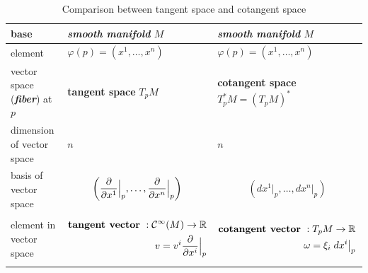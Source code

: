 \documentclass[11pt]{article}
\begin{document}
\begin{table}[h!]
\setlength{\abovedisplayskip}{0pt}
\setlength{\belowdisplayskip}{-10pt}
\setlength{\abovedisplayshortskip}{0pt}
\setlength{\belowdisplayshortskip}{0pt}
\centering
\caption{Comparison between tangent space and cotangent space}
\label{tab: tangent_cotangent}
\renewcommand\tabularxcolumn[1]{m{#1}}
\footnotesize
\begin{tabularx}{1\textwidth} { 
  | >{\raggedright\arraybackslash} m{2cm}
  | >{\centering\arraybackslash}X
  | >{\centering\arraybackslash}X  | }
 \hline
 base &  \emph{\textbf{smooth manifold}} $M$ & \emph{\textbf{smooth manifold}} $M$  \\
 \hline
 element  & $\varphi(p) = (x^1, \ldots, x^{n})$ & $\varphi(p) = (x^1, \ldots, x^{n})$\\
\hline
vector space (\emph{\textbf{fiber}}) at $p$ &  \textbf{tangent space}  $T_{p}M$ &  \textbf{cotangent space} $T_{p}^{*}M = (T_{p}M)^{*}$ \\
\hline
dimension of vector space & $n$ & $n$  \\
\hline
basis of vector space & 
\vspace{-1.25em}
\begin{align*}
 \left(\dfrac{\partial}{\partial x^{1}}\Bigr|_{p}, \ldots, \dfrac{\partial}{\partial x^{n}}\Bigr|_{p}\right)
\end{align*}
\vspace{-1em}
 &   
\vspace{-1.25em}
\begin{align*}
 (dx^1\bigr|_{p}, \ldots, dx^n\bigr|_{p})
\end{align*} \vspace{-1em}\\
\hline
element in vector space   &
\vspace{-1.25em}
 \begin{align*} 
\text{\textbf{tangent vector} }:{\mathcal C}^{\infty}(M) \rightarrow {\mathbb R}\\
  v = v^{i}\dfrac{\partial}{\partial x^{i}}\Bigr|_{p}
 \end{align*} \vspace{-1em}  & 
\vspace{-1.25em} 
 \begin{align*} 
 \text{\textbf{cotangent vector} }:T_pM \rightarrow {\mathbb R}\\
 \omega = \xi_{i}\;dx^i\bigr|_{p}
 \end{align*} \vspace{-1em} \\

\end{tabularx}
\end{table}
\end{document}
